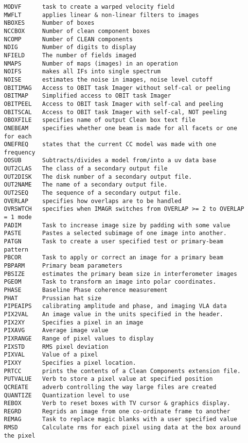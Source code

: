 \begin{verbatim}
MODVF      task to create a warped velocity field
MWFLT      applies linear & non-linear filters to images
NBOXES     Number of boxes
NCCBOX     Number of clean component boxes
NCOMP      Number of CLEAN components
NDIG       Number of digits to display
NFIELD     The number of fields imaged
NMAPS      Number of maps (images) in an operation
NOIFS      makes all IFs into single spectrum
NOISE      estimates the noise in images, noise level cutoff
OBITIMAG   Access to OBIT task Imager without self-cal or peeling
OBITMAP    Simplified access to OBIT task Imager
OBITPEEL   Access to OBIT task Imager with self-cal and peeling
OBITSCAL   Access to OBIT task Imager with self-cal, NOT peeling
OBOXFILE   specifies name of output Clean box text file
ONEBEAM    specifies whether one beam is made for all facets or one for each
ONEFREQ    states that the current CC model was made with one frequency
OOSUB      Subtracts/divides a model from/into a uv data base
OUT2CLAS   The class of a secondary output file
OUT2DISK   The disk number of a secondary output file.
OUT2NAME   The name of a secondary output file.
OUT2SEQ    The sequence of a secondary output file.
OVERLAP    specifies how overlaps are to be handled
OVRSWTCH   specifies when IMAGR switches from OVERLAP >= 2 to OVERLAP = 1 mode
PADIM      Task to increase image size by padding with some value
PASTE      Pastes a selected subimage of one image into another.
PATGN      Task to create a user specified test or primary-beam pattern
PBCOR      Task to apply or correct an image for a primary beam
PBPARM     Primary beam parameters
PBSIZE     estimates the primary beam size in interferometer images
PGEOM      Task to transform an image into polar coordinates.
PHASE      Baseline Phase coherence measurement
PHAT       Prussian hat size
PIPEAIPS   calibrating amplitude and phase, and imaging VLA data
PIX2VAL    An image value in the units specified in the header.
PIX2XY     Specifies a pixel in an image
PIXAVG     Average image value
PIXRANGE   Range of pixel values to display
PIXSTD     RMS pixel deviation
PIXVAL     Value of a pixel
PIXXY      Specifies a pixel location.
PRTCC      prints the contents of a Clean Components extension file.
PUTVALUE   Verb to store a pixel value at specified position
QCREATE    adverb controlling the way large files are created
QUANTIZE   Quantization level to use
REBOX      Verb to reset boxes with TV cursor & graphics display.
REGRD      Regrids an image from one co-ordinate frame to another
REMAG      Task to replace magic blanks with a user specified value
RMSD       Calculate rms for each pixel using data at the box around the pixel

\end{verbatim}
